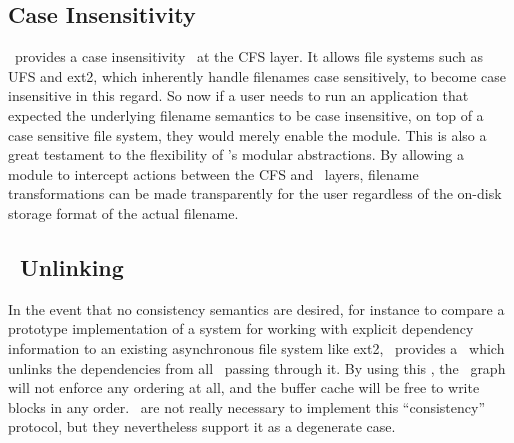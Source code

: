 


\subsection{Case Insensitivity}
\label{sec:modules:icase}
\Kudos\ provides a case insensitivity \module\ at the CFS layer. It
allows file systems such as UFS and ext2, which inherently handle filenames
case sensitively, to become case insensitive in this regard. So now if a user
needs to run an application that expected the underlying filename semantics
to be case insensitive, on top of a case sensitive file system, they would
merely enable the module. This is also a great testament to the flexibility
of \Kudos's modular abstractions. By allowing a module to intercept actions
between the CFS and \LFS\ layers, filename transformations can be made
transparently for the user regardless of the on-disk storage format of
the actual filename.

\subsection{\ChDesc\ Unlinking}
\label{sec:modules:unlink}
In the event that no consistency semantics are desired, for instance to compare
a prototype implementation of a system for working with explicit dependency
information to an existing asynchronous file system like ext2, \Kudos\ provides
a \module\ which unlinks the dependencies from all \chdescs\ passing through it.
By using this \module, the \chdesc\ graph will not enforce any ordering at all,
and the buffer cache will be free to write blocks in any order. \Chdescs\ are
not really necessary to implement this ``consistency'' protocol, but they
nevertheless support it as a degenerate case.

